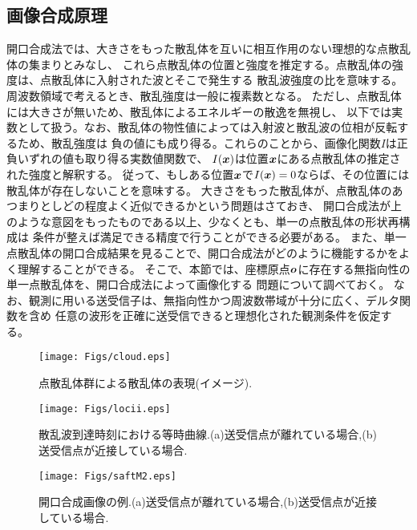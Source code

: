 \documentclass[10pt,a4j,dvipdfmx]{jarticle}
\begin{document}
\subsection{画像合成原理}
開口合成法では、大きさをもった散乱体を互いに相互作用のない理想的な点散乱体の集まりとみなし、
これら点散乱体の位置と強度を推定する。点散乱体の強度は、点散乱体に入射された波とそこで発生する
散乱波強度の比を意味する。周波数領域で考えるとき、散乱強度は一般に複素数となる。
ただし、点散乱体には大きさが無いため、散乱体によるエネルギーの散逸を無視し、
以下では実数として扱う。なお、散乱体の物性値によっては入射波と散乱波の位相が反転するため、散乱強度は
負の値にも成り得る。これらのことから、画像化関数$I$は正負いずれの値も取り得る実数値関数で、
$I(\mbox{\boldmath $x$})$は位置$\mbox{\boldmath $x$}$にある点散乱体の推定された強度と解釈する。
従って、もしある位置$\mbox{\boldmath $x$}$で$I(\mbox{\boldmath $x$})=0$ならば、その位置には散乱体が存在しないことを意味する。
大きさをもった散乱体が、点散乱体のあつまりとしどの程度よく近似できるかという問題はさておき、
開口合成法が上のような意図をもったものである以上、少なくとも、単一の点散乱体の形状再構成は
条件が整えば満足できる精度で行うことができる必要がある。
また、単一点散乱体の開口合成結果を見ることで、開口合成法がどのように機能するかをよく理解することができる。
そこで、本節では、座標原点$\mbox{\boldmath $o$}$に存在する無指向性の単一点散乱体を、開口合成法によって画像化する
問題について調べておく。
なお、観測に用いる送受信子は、無指向性かつ周波数帯域が十分に広く、デルタ関数を含め
任意の波形を正確に送受信できると理想化された観測条件を仮定する。
\begin{figure}[h]
	\begin{center}
	\texttt{[image: Figs/cloud.eps]} 
	\end{center}
	\caption{点散乱体群による散乱体の表現(イメージ).} 
	\label{fig:cloud}
\end{figure}
\begin{figure}[h]
	\begin{center}
	\texttt{[image: Figs/locii.eps]} 
	\end{center}
	\caption{散乱波到達時刻における等時曲線.(a)送受信点が離れている場合,(b)送受信点が近接している場合.} 
	\label{fig:locii}
\end{figure}
\begin{figure}[h]
	\begin{center}
	\texttt{[image: Figs/saftM2.eps]} 
	\end{center}
	\caption{開口合成画像の例.(a)送受信点が離れている場合,(b)送受信点が近接している場合.} 
	\label{fig:saftM2}
\end{figure}
\end{document}
